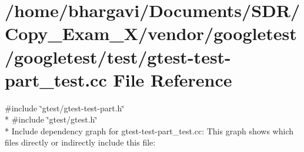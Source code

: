 \hypertarget{gtest-test-part__test_8cc}{}\section{/home/bhargavi/\+Documents/\+S\+D\+R/\+Copy\+\_\+\+Exam\+\_\+X/vendor/googletest/googletest/test/gtest-\/test-\/part\+\_\+test.cc File Reference}
\label{gtest-test-part__test_8cc}
{\ttfamily \#include \char`\"{}gtest/gtest-\/test-\/part.\+h\char`\"{}}\\*
{\ttfamily \#include \char`\"{}gtest/gtest.\+h\char`\"{}}\\*
Include dependency graph for gtest-\/test-\/part\+\_\+test.cc\+:
This graph shows which files directly or indirectly include this file\+:

